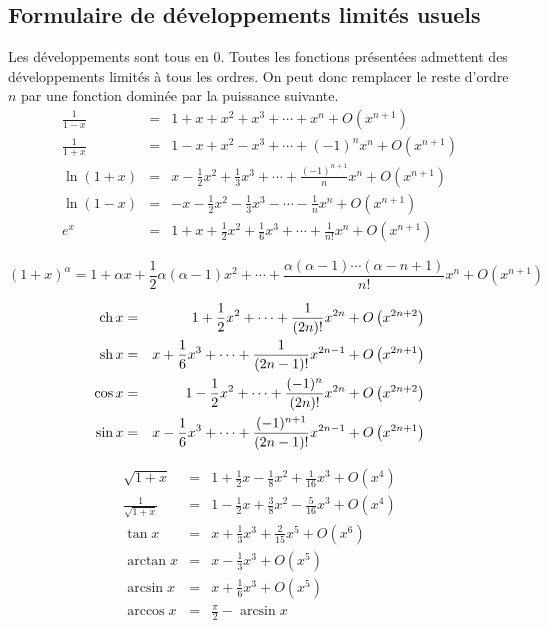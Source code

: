  
\clearpage
\subsection{Formulaire de développements limités usuels}
Les développements sont tous en $0$. Toutes les fonctions présentées admettent des développements limités à tous les ordres. On peut donc remplacer le reste d'ordre $n$ par une fonction dominée par la puissance suivante. 
\begin{eqnarray*}
\frac 1{1-x} &=&1+x+x^2+x^3+\cdots +x^n+O\left( x^{n+1}\right) \\
\frac 1{1+x} &=&1-x+x^2-x^3+\cdots +(-1)^nx^n+O\left( x^{n+1}\right) \\
\ln (1+x) &=&x-\frac 12x^2+\frac 13x^3+\cdots +\frac{(-1)^{n+1}}nx^n+O\left(
x^{n+1}\right) \\
\ln (1-x) &=&-x-\frac 12x^2-\frac 13x^3-\cdots -\frac 1nx^n+O\left(
x^{n+1}\right) \\
e^x &=&1+x+\frac 12x^2+\frac 16x^3+\cdots +\frac 1{n!}x^n+O\left(
x^{n+1}\right)
\end{eqnarray*}

\[
(1+x)^\alpha =1+\alpha x+\frac 12\alpha \left( \alpha -1\right) x^2+\cdots +%
\frac{\alpha (\alpha -1)\cdots (\alpha -n+1)}{n!}x^n+O\left( x^{n+1}\right) 
\]

\begin{eqnarray*}
\ch x &=&1+\frac{1}{2}x^{2}+\cdots +\frac{1}{(2n)!}x^{2n}+O\left(
x^{2n+2}\right)  \\
\sh x &=&x+\frac{1}{6}x^{3}+\cdots +\frac{1}{(2n-1)!}x^{2n-1}+O\left(
x^{2n+1}\right)  \\
\cos x &=&1-\frac{1}{2}x^{2}+\cdots +\frac{(-1)^{n}}{(2n)!}x^{2n}+O\left(
x^{2n+2}\right)  \\
\sin x &=&x-\frac{1}{6}x^{3}+\cdots +\frac{(-1)^{n+1}}{(2n-1)!}%
x^{2n-1}+O\left( x^{2n+1}\right) 
\end{eqnarray*}

\begin{eqnarray*}
\sqrt{1+x} &=&1+\frac{1}{2}x-\frac{1}{8}x^{2}+\frac{1}{16}x^{3}+O\left(
x^{4}\right)  \\
\frac{1}{\sqrt{1+x}} &=&1-\frac{1}{2}x+\frac{3}{8}x^{2}-\frac{5}{16}%
x^{3}+O\left( x^{4}\right)  \\
\tan x &=&x+\frac{1}{3}x^{3}+\frac{2}{15}x^{5}+O\left( x^{6}\right)  \\
\arctan x &=&x-\frac{1}{3}x^{3}+O\left( x^{5}\right)  \\
\arcsin x &=&x+\frac{1}{6}x^{3}+O\left( x^{5}\right)  \\
\arccos x &=&\frac{\pi }{2}-\arcsin x
\end{eqnarray*}
\clearpage


